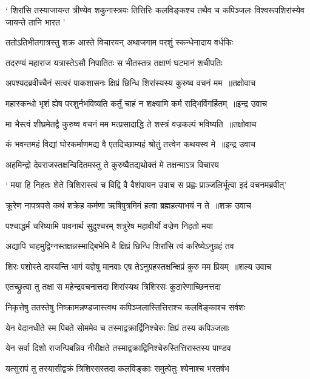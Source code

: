 \threelineshloka
{` शिरांसि तस्याजायन्त त्रीण्येव शकुनास्त्रयः}
{तित्तिरिः कलविङ्कश्च तथैव च कपिञ्जलः}
{विश्वरूपशिरांस्येव जायन्ते तानि भारत '}


\twolineshloka
{ततोऽतिभीतगात्रस्तु शक्र आस्ते विचारयन्}
{अथाजगाम परशुं स्कन्धेनादाय वर्धकिः}


\twolineshloka
{तदरण्यं महाराज यत्रास्तेऽसौ निपातितः}
{स भीतस्तत्र तक्षाणं घटमानं शचीपतिः}


\threelineshloka
{अपश्यदब्रवीच्चैनं सत्वरं पाकशासनः}
{क्षिप्रं छिन्धि शिरांस्यस्य कुरुष्व वचनं मम ॥तक्षोवाच}
{}


\threelineshloka
{महास्कन्धो भृशं ह्येष परशुर्नभविष्यति}
{कर्तुं चाहं न शक्ष्यामि कर्म राद्भिर्विगर्हितम् ॥इन्द्र उवाच}
{}


\threelineshloka
{मा भैस्त्वं शीघ्रमेतद्वै कुरुष्व वचनं मम}
{मत्प्रसादाद्धि ते शस्त्रं वज्रकल्पं भविष्यति ॥तक्षोवाच}
{}


\threelineshloka
{कं भवन्तमहं विद्यां घोरकर्माणमद्य वै}
{एतदिच्छाम्यहं श्रोतुं तत्त्वेन कथयस्व मे ॥इन्द्र उवाच}
{}


\twolineshloka
{अहमिन्द्रो देवराजस्तक्षन्विदितमस्तु ते}
{कुरुष्वैतद्यथोक्तं मे तक्षन्माऽत्र विचारय}


\threelineshloka
{` मया हि निहतः शेते त्रिशिरास्त्वं च विद्वि वै}
{वैशंपायन उवाच}
{स प्रह्वः प्राञ्जलिर्भूत्वा इदं वचनमब्रवीत्'}


\threelineshloka
{क्रूरेण नापत्रपसे कथं शक्रेह कर्मणा}
{ऋषिपुत्रमिमं हत्वा ब्रह्महत्याभयं न ते ॥शक्र उवाच}
{}


\twolineshloka
{पश्चाद्धर्मं चरिष्यामि पावनार्थ सुदुश्चरम्}
{शत्रुरेष महावीर्यो वज्रेण निहतो मया}


\twolineshloka
{अद्यापि चाहमुद्विग्नस्तक्षन्नस्माद्बिभेमि वै}
{क्षिप्रं छिन्धि शिरांसि त्वं करिष्येऽनुग्रहं तव}


\threelineshloka
{शिरः पशोस्ते दास्यन्ति भागं यज्ञेषु मानवाः}
{एष तेऽनुग्रहस्तक्षन्क्षिप्रं कुरु मम प्रियम् ॥शल्य उवाच}
{}


\twolineshloka
{एतच्छ्रुत्वा तु तक्षा स महेन्द्रवचनात्तदा}
{शिरांस्यथ त्रिशिरसः कुठारेणाच्छिनत्तदा}


\twolineshloka
{निकृत्तेषु ततस्तेषु निष्क्रामन्नण्डजास्त्वथ}
{कपिञ्जलास्तित्तिराश्च कलविङ्काश्च सर्वशः}


\twolineshloka
{येन वेदानधीते स्म पिबते सोममेव च}
{तस्माद्वक्रार्द्विनिश्चेरुः क्षिप्रं तस्य कपिञ्जलाः}


\twolineshloka
{येन सर्वा दिशो राजन्पिबन्निव नीरीक्षते}
{तस्माद्वक्राद्विनिश्चेरुस्तित्तिरास्तस्य पाण्डव}


\twolineshloka
{यत्सुरापं तु तस्यासीद्वक्रं त्रिशिरसस्तदा}
{कलविङ्काः समुत्पेतुः श्येनाश्च भरतर्षभ}


